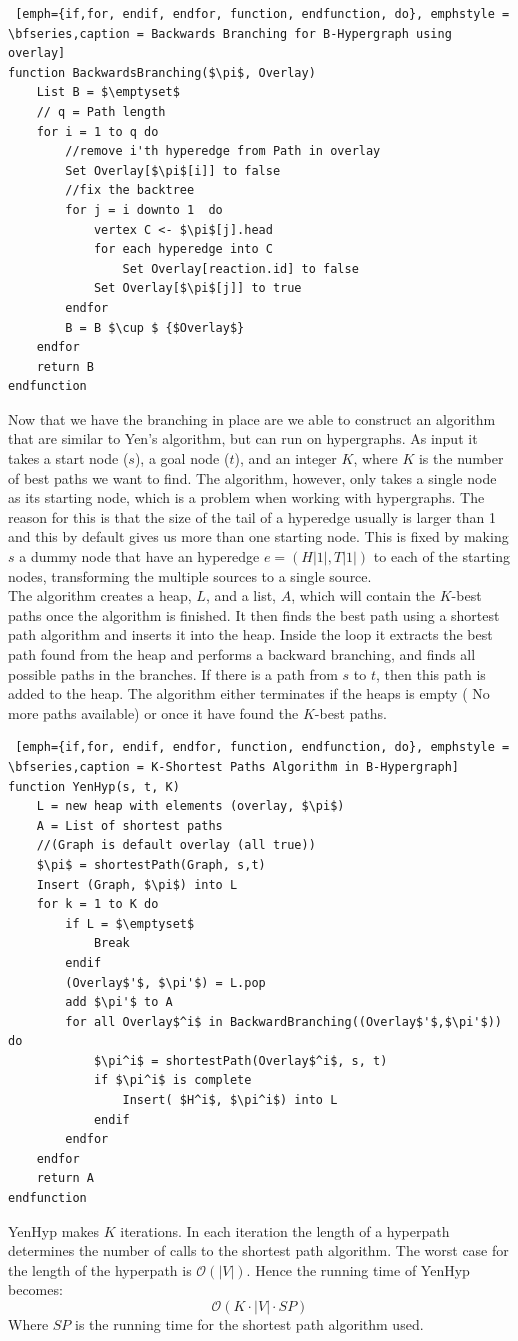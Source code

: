 \documentclass[a4paper,10pt,titlepage]{paper}
\begin{document}
\begin{lstlisting} [emph={if,for, endif, endfor, function, endfunction, do}, emphstyle = \bfseries,caption = Backwards Branching for B-Hypergraph using overlay]
function BackwardsBranching($\pi$, Overlay) 						
	List B = $\emptyset$
	// q = Path length
	for i = 1 to q do			
		//remove i'th hyperedge from Path in overlay					
		Set Overlay[$\pi$[i]] to false		
		//fix the backtree				
		for j = i downto 1	do							
			vertex C <- $\pi$[j].head
			for each hyperedge into C
				Set Overlay[reaction.id] to false
			Set Overlay[$\pi$[j]] to true
		endfor
		B = B $\cup $ {$Overlay$}
	endfor
	return B
endfunction
\end{lstlisting}
Now that we have the branching in place are we able to construct an algorithm that are similar to Yen's algorithm, but can run on hypergraphs. As input it takes a start node ($s$), a goal node ($t$), and an integer $K$, where $K$ is the number of best paths we want to find. The algorithm, however, only takes a single node as its starting node, which is a problem when working with hypergraphs. The reason for this is that the size of the tail of a hyperedge usually is larger than 1 and this by default gives us more than one starting node. This is fixed by making $s$ a dummy node that have an hyperedge $e = (H|1|, T|1|)$ to each of the starting nodes, transforming the multiple sources to a single source.\\
The algorithm creates a heap, $L$, and a list, $A$, which will contain the $K$-best paths once the algorithm is finished. It then finds the best path using a shortest path algorithm and inserts it into the heap. Inside the loop it extracts the best path found from the heap and performs a backward branching, and finds all possible paths in the branches. If there is a path from $s$ to $t$, then this path is added to the heap. The algorithm either terminates if the heaps is empty ( No more paths available) or once it have found the $K$-best paths.
\begin{lstlisting} [emph={if,for, endif, endfor, function, endfunction, do}, emphstyle = \bfseries,caption = K-Shortest Paths Algorithm in B-Hypergraph]
function YenHyp(s, t, K) 
	L = new heap with elements (overlay, $\pi$)
	A = List of shortest paths
	//(Graph is default overlay (all true))
	$\pi$ = shortestPath(Graph, s,t) 				
	Insert (Graph, $\pi$) into L
	for k = 1 to K do
		if L = $\emptyset$
			Break
		endif
		(Overlay$'$, $\pi'$) = L.pop
		add $\pi'$ to A
		for all Overlay$^i$ in BackwardBranching((Overlay$'$,$\pi'$)) do
			$\pi^i$ = shortestPath(Overlay$^i$, s, t)
			if $\pi^i$ is complete
				Insert( $H^i$, $\pi^i$) into L
			endif
		endfor
	endfor
	return A
endfunction
\end{lstlisting}
YenHyp makes $K$ iterations. In each iteration the length of a hyperpath determines the number of calls to the shortest path algorithm. The worst case for the length of the hyperpath is $\mathcal{O}(|V|)$. Hence the running time of YenHyp becomes:
\begin{equation}
\mathcal{O}(K \cdot |V| \cdot SP)
\end{equation}
Where $SP$ is the running time for the shortest path algorithm used.
\end{document}
